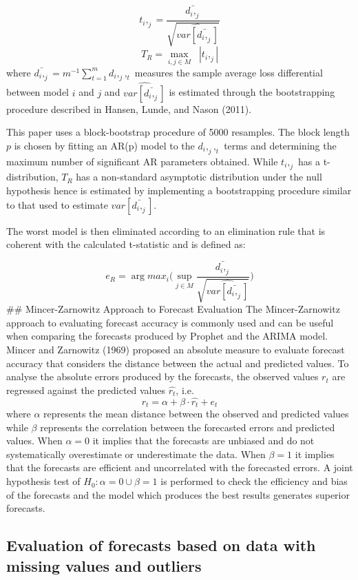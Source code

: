 \documentclass[12pt,a4paper]{article}
\numberwithin{equation}{section}
\numberwithin{figure}{section}
\numberwithin{table}{section}
\begin{document}
\[t_i,_j = \frac{\bar{d_i,_j}}{\sqrt{\hat{var[\bar{d_i,_j}]}}}\]
\vspace{1pt} \[ T_R = \max_{i,j\in M} \;\; |t_i,_j|\] where
\(\bar{d_i,_j} = m^{-1}\sum_{t=1}^{m}{d_i,_j,_t }\) measures the sample
average loss differential between model \(i\) and \(j\) and
\(\hat{var[\bar{d_i,_j}]}\) is estimated through the bootstrapping
procedure described in Hansen, Lunde, and Nason (2011).

This paper uses a block-bootstrap procedure of 5000 resamples. The block
length \(p\) is chosen by fitting an AR(p) model to the \(d_i,_j,_t\)
terms and determining the maximum number of significant AR parameters
obtained. While \(t_i,_j\) has a t-distribution, \(T_R\) has a
non-standard asymptotic distribution under the null hypothesis hence is
estimated by implementing a bootstrapping procedure similar to that used
to estimate \({var[\bar{d_i,_j}]}\).

The worst model is then eliminated according to an elimination rule that
is coherent with the calculated t-statistic and is defined as:

\[e_R = \arg max_{i}\bigg(\sup_{j\in M}\frac{\bar{d_i,_j}}{\sqrt{\hat{var[\bar{d_i,_j}]}}}\bigg)\]
\#\# Mincer-Zarnowitz Approach to Forecast Evaluation The
Mincer-Zarnowitz approach to evaluating forecast accuracy is commonly
used and can be useful when comparing the forecasts produced by Prophet
and the ARIMA model. Mincer and Zarnowitz (1969) proposed an absolute
measure to evaluate forecast accuracy that considers the distance
between the actual and predicted values. To analyse the absolute errors
produced by the forecasts, the observed values \(r_t\) are regressed
against the predicted values \(\hat{r_t}\), i.e.
\[r_t = \alpha + \beta\cdot\hat{r_t} + e_t\] where \(\alpha\) represents
the mean distance between the observed and predicted values while
\(\beta\) represents the correlation between the forecasted errors and
predicted values. When \(\alpha = 0\) it implies that the forecasts are
unbiased and do not systematically overestimate or underestimate the
data. When \(\beta = 1\) it implies that the forecasts are efficient and
uncorrelated with the forecasted errors. A joint hypothesis test of
\(H_0: \alpha = 0 \cup \beta = 1\) is performed to check the efficiency
and bias of the forecasts and the model which produces the best results
generates superior forecasts.

\subsection{Evaluation of forecasts based on data with missing values
and
outliers}\label{evaluation-of-forecasts-based-on-data-with-missing-values-and-outliers}
\end{document}

